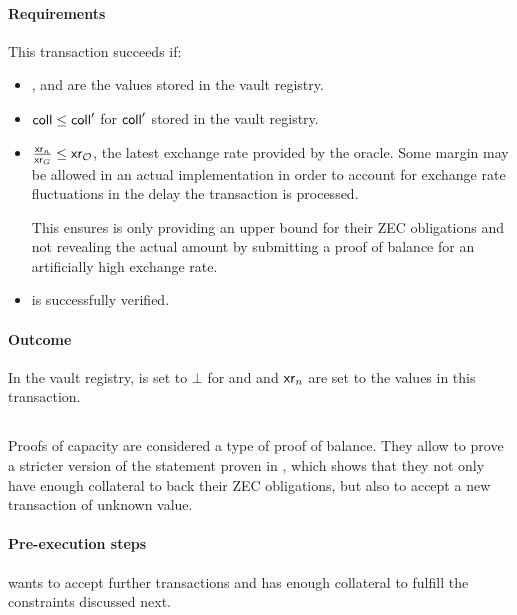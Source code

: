 \paragraph{Requirements}
This transaction succeeds if:
\begin{itemize}
    \item \dvf, \pkd and \cb are the values stored in the vault registry.
    
    \item $\mathsf{coll} \leq \mathsf{coll}'$ for $\mathsf{coll}'$ stored in the vault registry.
    
    \item $\frac{\mathsf{xr}_n}{\mathsf{xr}_{G}} \leq \mathsf{xr}_\mathcal{O}$, the latest exchange rate provided by the oracle.
    Some margin may be allowed in an actual implementation in order to account for exchange rate fluctuations in the delay the transaction is processed.
    
    This ensures \vault is only providing an upper bound for their ZEC obligations and not revealing the actual amount by submitting a proof of balance for an artificially high exchange rate.
    
    \item \pipob is successfully verified.
\end{itemize}

\paragraph{Outcome}
In the vault registry, \acci is set to $\bot$ for \vault and \coll and $\mathsf{xr}_n$ are set to the values in this transaction.

\subsection{\submitPOCop}
Proofs of capacity are considered a type of proof of balance.
They allow \vault to prove a stricter version of the statement proven in \submitPOBop, which shows that they not only have enough collateral to back their ZEC obligations, but also to accept a new \lock transaction of unknown value.

\paragraph{Pre-execution steps}
\vault wants to accept further \lock transactions and has enough collateral to fulfill the constraints discussed next.

